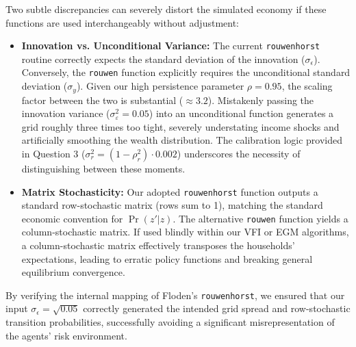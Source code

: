 \documentclass[11pt, a4paper]{article}
\begin{document}
Two subtle discrepancies can severely distort the simulated economy if these functions are used interchangeably without adjustment:
\begin{itemize}
    \item \textbf{Innovation vs. Unconditional Variance:} The current \texttt{rouwenhorst} routine correctly expects the standard deviation of the innovation ($\sigma_\epsilon$). Conversely, the \texttt{rouwen} function explicitly requires the unconditional standard deviation ($\sigma_y$). Given our high persistence parameter $\rho=0.95$, the scaling factor between the two is substantial ($\approx 3.2$). Mistakenly passing the innovation variance ($\sigma^2_\varepsilon = 0.05$) into an unconditional function generates a grid roughly three times too tight, severely understating income shocks and artificially smoothing the wealth distribution. The calibration logic provided in Question 3 ($\sigma^2_r = (1-\rho_r^2) \cdot 0.002$) underscores the necessity of distinguishing between these moments.
    \item \textbf{Matrix Stochasticity:} Our adopted \texttt{rouwenhorst} function outputs a standard row-stochastic matrix (rows sum to 1), matching the standard economic convention for $\Pr(z'|z)$. The alternative \texttt{rouwen} function yields a column-stochastic matrix. If used blindly within our VFI or EGM algorithms, a column-stochastic matrix effectively transposes the households' expectations, leading to erratic policy functions and breaking general equilibrium convergence.
\end{itemize}

By verifying the internal mapping of Floden's \texttt{rouwenhorst}, we ensured that our input $\sigma_\epsilon = \sqrt{0.05}$ correctly generated the intended grid spread and row-stochastic transition probabilities, successfully avoiding a significant misrepresentation of the agents' risk environment.
\end{document}
